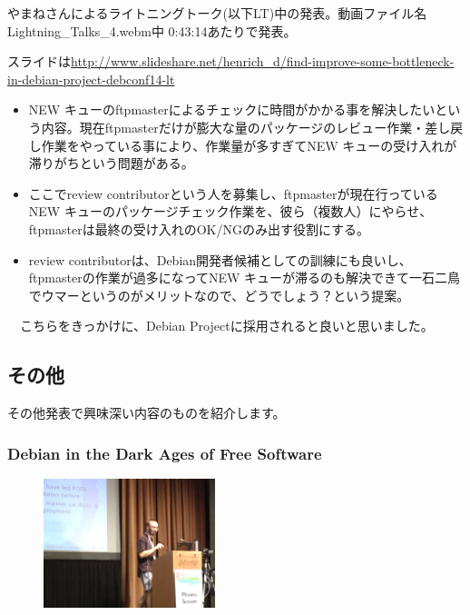 \documentclass[mingoth,a4paper]{jsarticle}
\begin{document}
 やまねさんによるライトニングトーク(以下LT)中の発表。動画ファイル名Lightning\_Talks\_4.webm中 0:43:14あたりで発表。

 スライドは\url{http://www.slideshare.net/henrich_d/find-improve-some-bottleneck-in-debian-project-debconf14-lt}

 \begin{itemize}
  \item NEW キューのftpmasterによるチェックに時間がかかる事を解決したいという内容。現在ftpmasterだけが膨大な量のパッケージのレビュー作業・差し戻し作業をやっている事により、作業量が多すぎてNEW キューの受け入れが滞りがちという問題がある。
  \item ここでreview contributorという人を募集し、ftpmasterが現在行っているNEW キューのパッケージチェック作業を、彼ら（複数人）にやらせ、ftpmasterは最終の受け入れのOK/NGのみ出す役割にする。
 \end{itemize}

 \begin{itemize}
 \item review contributorは、Debian開発者候補としての訓練にも良いし、ftpmasterの作業が過多になってNEW キューが滞るのも解決できて一石二鳥でウマーというのがメリットなので、どうでしょう？という提案。
\end{itemize}

　こちらをきっかけに、Debian Projectに採用されると良いと思いました。

\subsection{その他}

 その他発表で興味深い内容のものを紹介します。

 \subsubsection{Debian in the Dark Ages of Free Software}

\begin{figure}
  \includegraphics[width=5cm]{image201409/dark_age.png}
\end{figure}
\end{document}
